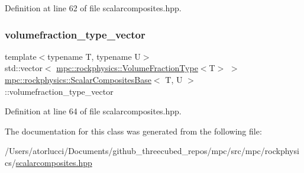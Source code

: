 Definition at line 62 of file scalarcomposites.\+hpp.

\mbox{\label{classmpc_1_1rockphysics_1_1_scalar_composites_base_a7b14158ca347b93da4c97cbcdfaa9e31}} 
\subsubsection{\texorpdfstring{volumefraction\+\_\+type\+\_\+vector}{volumefraction\_type\_vector}}
{\footnotesize\ttfamily template$<$typename T, typename U$>$ \\
std\+::vector$<$ \mbox{\hyperlink{structmpc_1_1rockphysics_1_1_volume_fraction_type}{mpc\+::rockphysics\+::\+Volume\+Fraction\+Type}}$<$T$>$ $>$ \mbox{\hyperlink{classmpc_1_1rockphysics_1_1_scalar_composites_base}{mpc\+::rockphysics\+::\+Scalar\+Composites\+Base}}$<$ T, U $>$\+::volumefraction\+\_\+type\+\_\+vector\hspace{0.3cm}{\ttfamily [protected]}}



Definition at line 64 of file scalarcomposites.\+hpp.



The documentation for this class was generated from the following file\+:\begin{DoxyCompactItemize}
\item 
/\+Users/atorlucci/\+Documents/github\+\_\+threecubed\+\_\+repos/mpc/src/mpc/rockphysics/\mbox{\hyperlink{scalarcomposites_8hpp}{scalarcomposites.\+hpp}}\end{DoxyCompactItemize}
